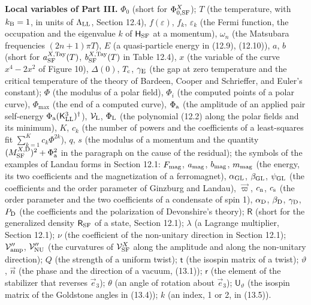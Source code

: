 \documentclass[
  10pt,
]{article}
\begin{document}
\textbf{Local variables of Part III.} \(\Phi_0\) (short for
\(\Phi^X_{0,{\rm SF}}\)); \(T\) (the temperature, with \(k_{\rm B}=1\),
in units of \(\Lambda_{\rm LL}\), Section 12.4), \(f(\varepsilon)\),
\(f_k\), \(\varepsilon_k\) (the Fermi function, the occupation and the
eigenvalue \(k\) of \(\mathsf H_{\rm SF}\) at a momentum), \(\omega_n\)
(the Matsubara frequencies \((2n+1)\pi T\)), \(E\) (a quasi-particle
energy in (12.9), (12.10)), \(a\), \(b\) (short for
\(a^{X,{\rm Tay}}_{\rm SF}(T)\), \(b^{X,{\rm Tay}}_{\rm SF}(T)\) in
Table 12.4), \(x\) (the variable of the curve \(x^4-2x^2\) of Figure
10), \(\Delta(0)\), \(T_{\rm c}\), \(\gamma_{\rm E}\) (the gap at zero
temperature and the critical temperature of the theory of Bardeen,
Cooper and Schrieffer, and Euler's constant); \(\Phi\) (the modulus of a
polar field), \(\Phi_i\) (the computed points of a polar curve),
\(\Phi_{\max}\) (the end of a computed curve), \(\Phi_{\rm a}\) (the
amplitude of an applied pair self-energy
\(\Phi_{\rm a}(\mathsf K^3_{\rm LL})^\dagger\)), \(\mathcal V_{\rm L}\),
\(\Phi_{\rm L}\) (the polynomial (12.2) along the polar fields and its
minimum), \(K\), \(c_k\) (the number of powers and the coefficients of a
least-squares fit \(\sum_{k=1}^Kc_k\Phi^{2k}\)), \(q\), \(s\) (the
modulus of a momentum and the quantity
\((M^{X,{\rm D}}_{\rm SF})^2+\Phi_{\rm a}^2\) in the paragraph on the
cause of the residual); the symbols of the examples of Landau forms in
Section 12.1: \(F_{\rm mag}\), \(a_{\rm mag}\), \(b_{\rm mag}\),
\(m_{\rm mag}\) (the energy, its two coefficients and the magnetization
of a ferromagnet), \(\alpha_{\rm GL}\), \(\beta_{\rm GL}\),
\(\psi_{\rm GL}\) (the coefficients and the order parameter of Ginzburg
and Landau), \(\vec\varpi\), \(c_{\rm n}\), \(c_{\rm s}\) (the order
parameter and the two coefficients of a condensate of spin 1),
\(\alpha_{\rm D}\), \(\beta_{\rm D}\), \(\gamma_{\rm D}\), \(P_{\rm D}\)
(the coefficients and the polarization of Devonshire's theory);
\(\mathsf R\) (short for the generalized density \(\mathsf R_{\rm SF}\)
of a state, Section 12.1); \(\lambda\) (a Lagrange multiplier, Section
12.1); \(\nu\) (the coefficient of the non-unitary direction in Section
12.1); \(\mathcal V''_{\rm amp}\), \(\mathcal V''_{\rm NU}\) (the
curvatures of \(\mathcal V^X_{\rm SF}\) along the amplitude and along
the non-unitary direction); \(Q\) (the strength of a uniform twist);
\(\mathsf t\) (the isospin matrix of a twist); \(\vartheta\), \(\vec n\)
(the phase and the direction of a vacuum, (13.1)); \(\mathsf r\) (the
element of the stabilizer that reverses \(\vec e_3\)); \(\theta\) (an
angle of rotation about \(\vec e_3\)); \(\mathsf U_\vartheta\) (the
isospin matrix of the Goldstone angles in (13.4)); \(k\) (an index, 1 or
2, in (13.5)).
\end{document}
